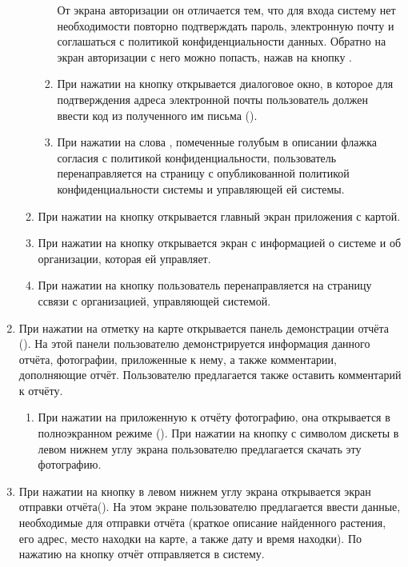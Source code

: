 \begin{enumerate}
\begin{enumerate}
\begin{enumerate}
			От экрана авторизации он отличается тем, что для входа систему нет необходимости повторно подтверждать пароль, электронную почту и соглашаться с политикой конфиденциальности данных.
			Обратно на экран авторизации с него можно попасть, нажав на кнопку .
			\item При нажатии на кнопку  открывается диалоговое окно, в которое для подтверждения адреса электронной почты пользователь должен ввести код из полученного им письма ().
			\item При нажатии на слова , помеченные голубым в описании флажка согласия с политикой конфиденциальности, пользователь перенаправляется на страницу с опубликованной политикой конфиденциальности системы и управляющей ей системы.
		\end{enumerate}
		\item При нажатии на кнопку  открывается главный экран приложения с картой.
		\item При нажатии на кнопку  открывается экран с информацией о системе и об организации, которая ей управляет.
		\item При нажатии на кнопку  пользователь перенаправляется на страницу ссвязи с организацией, управляющей системой.
	\end{enumerate}
	\item При нажатии на отметку на карте открывается панель демонстрации отчёта ().
	На этой панели пользователю демонстрируется информация данного отчёта, фотографии, приложенные к нему, а также комментарии, дополняющие отчёт.
	Пользователю предлагается также оставить комментарий к отчёту.
	\begin{enumerate}
		\item При нажатии на приложенную к отчёту фотографию, она открывается в полноэкранном режиме ().
		При нажатии на кнопку с символом дискеты в левом нижнем углу экрана пользователю предлагается скачать эту фотографию.
	\end{enumerate}
	\item При нажатии на кнопку \textquote{+} в левом нижнем углу экрана открывается экран отправки отчёта().
	На этом экране пользователю предлагается ввести данные, необходимые для отправки отчёта (краткое описание найденного растения, его адрес, место находки на карте, а также дату и время находки).
	По нажатию на кнопку  отчёт отправляется в систему.
\end{enumerate}

